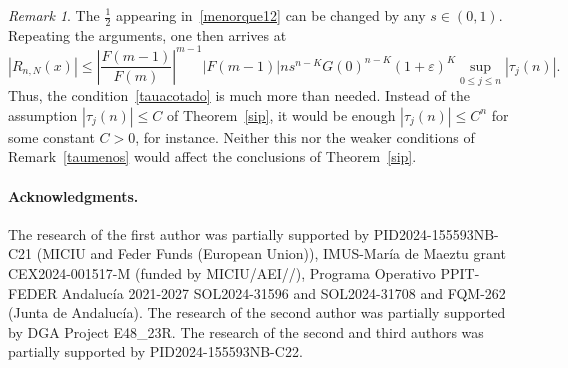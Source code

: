 \documentclass[10pt, a4paper, leqno]{amsart}
\numberwithin{equation}{section}
\theoremstyle{plain}
\theoremstyle{remark}
\newtheorem{Rem}{Remark}[section]
\newcommand{\eps}{\varepsilon}
\begin{document}
\begin{Rem}
The $\frac{1}{2}$ appearing in~\eqref{menorque12} can be changed by any $s \in (0,1)$. Repeating the arguments, one then arrives at
\[
  |R_{n,N}(x)| \le
  \left| \frac{F(m-1)}{F(m)} \right|^{m-1} |F(m-1)| n s^{n-K} G(0)^{n-K} (1+\eps)^K 
  \sup_{0 \le j \le n} |\tau_j(n)|.
\]
Thus, the condition~\eqref{tauacotado} is much more than needed. Instead of the assumption $|\tau_j(n)| \le C$ of Theorem~\ref{sip}, it would be enough $|\tau_j(n)| \le C^n$ for some constant $C > 0$, for instance. Neither this nor the weaker conditions of Remark~\ref{taumenos} would affect the conclusions of Theorem~\ref{sip}.
\end{Rem}

\paragraph{\textbf{Acknowledgments.}}

The research of the first author was partially supported by PID2024-155593NB-C21 (MICIU and Feder Funds (European Union)), IMUS-Mar\'ia de Maeztu grant CEX2024-001517-M (funded by MICIU/\allowbreak AEI//), Pro\-gra\-ma Ope\-ra\-ti\-vo PPIT-FEDER Anda\-lu\-c\'ia 2021-2027 SOL2024-31596 and SOL2024-31708 and FQM-262 (Jun\-ta de Anda\-lu\-c\'ia). 
The research of the second author was partially supported by DGA Project E48\_23R.
The research of the second and third authors was partially supported by PID2024-155593NB-C22.
\end{document}

